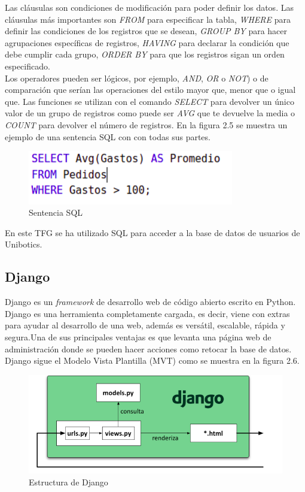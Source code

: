 \newpage
Las cláusulas son condiciones de modificación para poder definir los datos. Las cláusulas más importantes son \textit{FROM} para especificar la tabla, \textit{WHERE} para definir las condiciones de los registros que se desean, \textit{GROUP BY} para hacer agrupaciones específicas de registros, \textit{HAVING} para declarar la condición que debe cumplir cada grupo, \textit{ORDER BY} para que los registros sigan un orden especificado.\\

Los operadores pueden ser lógicos, por ejemplo, \textit{AND}, \textit{OR} o \textit{NOT}) o de comparación que serían las operaciones del estilo mayor que, menor que o igual que. Las funciones se utilizan con el comando \textit{SELECT} para devolver un único valor de un grupo de registros como puede ser\textit{ AVG }que te devuelve la media o \textit{COUNT }para devolver el número de registros. En la figura 2.5 se muestra un ejemplo de una sentencia SQL con con todas sus partes.\cite{sql}\\

\begin{figure}[H]
    \centering
    \includegraphics[width=9cm, keepaspectratio]{img/ejsql.png}
    \caption{Sentencia SQL}
    \label{fig:ejsql}
\end{figure}
En este TFG se ha utilizado SQL para acceder a la base de datos de usuarios de Unibotics.

\subsection{Django}
Django es un \textit{framework} de desarrollo web de código abierto escrito en Python. Django es una herramienta completamente cargada, es decir, viene con extras para ayudar al desarrollo de una web, además es versátil, escalable, rápida y segura.Una de sus principales ventajas es que  levanta una página web de administración donde se pueden hacer acciones como retocar la base de datos. Django sigue el Modelo Vista Plantilla (MVT) como se muestra en la figura 2.6.\\

\begin{figure}[H]
    \centering
    \includegraphics[width=12cm, keepaspectratio]{img/django.png}
    \caption{Estructura de Django}
    \label{fig:django}
\end{figure}


